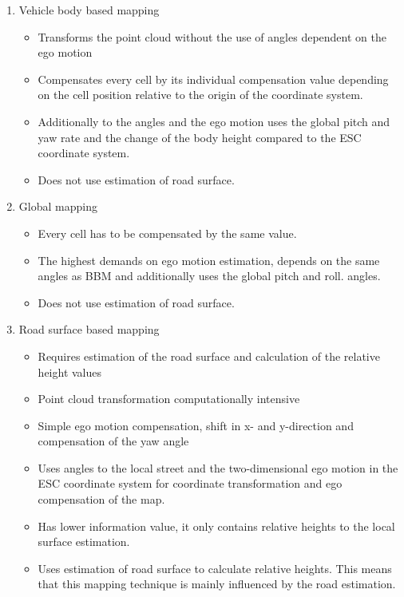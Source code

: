 \documentclass[conference]{IEEEtran}
\begin{document}
\begin{enumerate}
\item Vehicle body based mapping
\begin{itemize}
\item Transforms the point cloud without the use of angles dependent on the ego motion
\item Compensates every cell by its individual compensation value depending on the cell position relative to the origin of the coordinate system.
\item Additionally to the angles and the ego motion uses the global pitch and yaw rate and the change of the body height compared to the ESC coordinate system.
\item Does not use estimation of road surface.
\end{itemize}

\item Global mapping
\begin{itemize}
\item Every cell has to be compensated by the same value.
\item The highest demands on ego motion estimation, depends on the same angles as BBM and additionally uses the global pitch and roll. angles.
\item Does not use estimation of road surface.
\end{itemize}


\item Road surface based mapping
\begin{itemize}
\item Requires estimation of the road surface and calculation of the relative height values
\item Point cloud transformation computationally intensive
\item Simple ego motion compensation, shift in x- and y-direction and compensation of the yaw angle
\item Uses angles to the local street and the two-dimensional ego motion in the ESC coordinate system  for coordinate transformation and ego compensation of the map.
\item Has lower information value, it only contains relative heights to the local surface estimation. 
\item Uses estimation of road surface to calculate relative heights. This means that this mapping technique is mainly influenced by the road estimation.
\end{itemize}
\end{enumerate}
\end{document}
